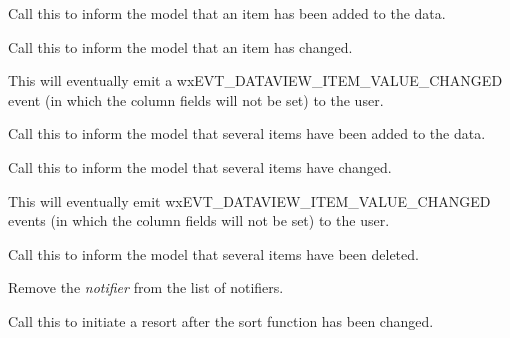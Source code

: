 Call this to inform the model that an item has been added
to the data.

\label{wxdataviewmodelitemchanged}


Call this to inform the model that an item has changed.

This will eventually emit a wxEVT\_DATAVIEW\_ITEM\_VALUE\_CHANGED
event (in which the column fields will not be set) to the user. 

\label{wxdataviewmodelitemsadded}


Call this to inform the model that several items have been added
to the data.

\label{wxdataviewmodelitemschanged}


Call this to inform the model that several items have changed.

This will eventually emit wxEVT\_DATAVIEW\_ITEM\_VALUE\_CHANGED
events (in which the column fields will not be set) to the user. 

\label{wxdataviewmodelitemsdeleted}


Call this to inform the model that several items have been deleted.

\label{wxdataviewmodelremovenotifier}


Remove the {\it notifier} from the list of notifiers.

\label{wxdataviewmodelresort}


Call this to initiate a resort after the sort function has
been changed.

\label{wxdataviewmodelsetvalue}

